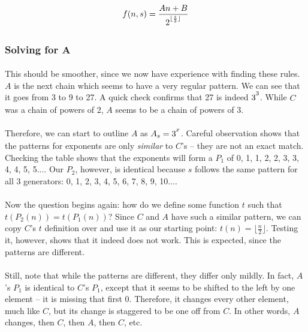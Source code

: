 \documentclass[12pt,letterpaper]{article}
\begin{document}
			\begin{equation*}
				f(n, s) = \frac{An + B}{2\strut^{\lfloor \frac{s}{2} \rfloor}}
			\end{equation*}
			
		\subsubsection{Solving for A}
		
			\paragraph{} This should be smoother, since we now have experience with finding these rules. $A$ is the next chain which seems to have a very regular pattern. We can see that it goes from 3 to 9 to 27. A quick check confirms that 27 is indeed $3\strut^3$. While $C$ was a chain of powers of 2, $A$ seems to be a chain of powers of 3.
			
			\paragraph{} Therefore, we can start to outline $A$ as $A_s = 3\strut^x$. Careful observation shows that the patterns for exponents are only \textit{similar} to $C$'s -- they are not an exact match. Checking the table shows that the exponents will form a $P_1$ of 0, 1, 1, 2, 2, 3, 3, 4, 4, 5, 5.... Our $P_2$, however, is identical because $s$ follows the same pattern for all 3 generators: 0, 1, 2, 3, 4, 5, 6, 7, 8, 9, 10....
			
			\paragraph{} Now the question begins again: how do we define some function $t$ such that $t(P_2(n)) = t(P_1(n))$? Since $C$ and $A$ have such a similar pattern, we can copy $C$'s $t$ definition over and use it as our starting point: $t(n) = \lfloor \frac{n}{2} \rfloor$. Testing it, however, shows that it indeed does not work. This is expected, since the patterns are different.
			
			\paragraph{} Still, note that while the patterns are different, they differ only mildly. In fact, $A$'s $P_1$ is identical to $C$'s $P_1$, except that it seems to be shifted to the left by one element -- it is missing that first 0. Therefore, it changes every other element, much like $C$, but its change is staggered to be one off from $C$. In other words, $A$ changes, then $C$, then $A$, then $C$, etc.
			
\end{document}
